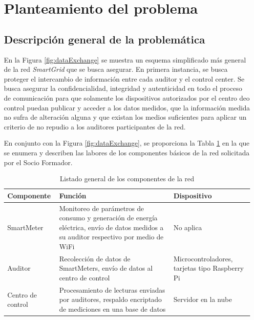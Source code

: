 \documentclass{article}
\begin{document}
    \section{Planteamiento del problema}

        \subsection{Descripción general de la problemática}

            En la Figura \ref{fig:dataExchange} se muestra un esquema simplificado más general de la red \textit{SmartGrid} que se busca asegurar. En primera instancia, se busca proteger el intercambio de información entre cada auditor y el control center. Se busca asegurar la confidencialidad, integridad y autenticidad en todo el proceso de comunicación para que solamente los dispositivos autorizados por el centro deo control puedan publicar y acceder a los datos medidos, que la información medida no sufra de alteración alguna y que existan los medios suficientes para aplicar un criterio de no repudio a los auditores participantes de la red.

            En conjunto con la Figura \ref{fig:dataExchange}, se proporciona la Tabla \ref{tab:component_basic} en la que se enumera y describen las labores de los componentes básicos de la red solicitada por el Socio Formador.
            \begin{table}[htbp]
                \centering
                \begin{tabularx}{\textwidth}{ |l|X|X| }
                    \hline
                    Componente & Función & Dispositivo \\
                    \hline
                    SmartMeter	& Monitoreo de parámetros de consumo y generación de energía eléctrica, envío de datos medidos a su auditor respectivo por medio de WiFi & No aplica \\
                    \hline
                    Auditor	& Recolección de datos de SmartMeters, envío de datos al centro de control & Microcontroladores, tarjetas tipo Raspberry Pi \\
                    \hline
                    Centro de control & Procesamiento de lecturas enviadas por auditores, respaldo encriptado de mediciones en una base de datos & Servidor en la nube \\
                    \hline
                \end{tabularx}
                \label{tab:component_basic}
                \caption{Listado general de los componentes de la red}
            \end{table}
\end{document}
